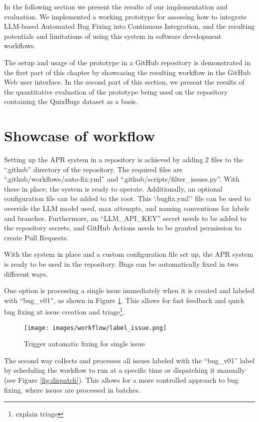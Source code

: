 In the following section we present the results of our implementation and evaluation. We implemented a working prototype for assessing how to integrate LLM-based Automated Bug Fixing into Continuous Integration, and the resulting potentials and limitations of using this system in software development workflows.

The setup and usage of the prototype in a GitHub repository is demonstrated in the first part of this chapter by showcasing the resulting workflow in the GitHub Web user interface. In the second part of this section, we present the results of the quantitative evaluation of the prototype being used on the repository containing the QuixBugs dataset as a basis.

\section{Showcase of workflow} \label{section:showcase}

Setting up the APR system in a repository is achieved by adding 2 files to the ``.github'' directory of the repository. The required files are ``.github/workflows/auto-fix.yml'' and ``.github/scripts/filter\_issues.py''. With these in place, the system is ready to operate. Additionally, an optional configuration file can be added to the root. This `.bugfix.yml'' file can be used to override the LLM model used, max attempts, and naming conventions for labels and branches. Furthermore, an ``LLM\_API\_KEY'' secret needs to be added to the repository secrets, and GitHub Actions needs to be granted permission to create Pull Requests.

With the system in place and a custom configuration file set up, the APR system is ready to be used in the repository. Bugs can be automatically fixed in two different ways.

One option is processing a single issue immediately when it is created and labeled with ``bug\_v01'', as shown in Figure \ref{fig:issue-trigger}. This allows for fast feedback and quick bug fixing at issue creation and triage\footnote{explain triage}.

\begin{figure}[H]
    \centering
    \texttt{[image: images/workflow/label\_issue.png]}
    \caption{Trigger automatic fixing for single issue}
    \label{fig:issue-trigger}
\end{figure}

The second way collects and processes all issues labeled with the ``bug\_v01'' label by scheduling the workflow to run at a specific time or dispatching it manually (see Figure \ref{fig:dispatch}). This allows for a more controlled approach to bug fixing, where issues are processed in batches.

